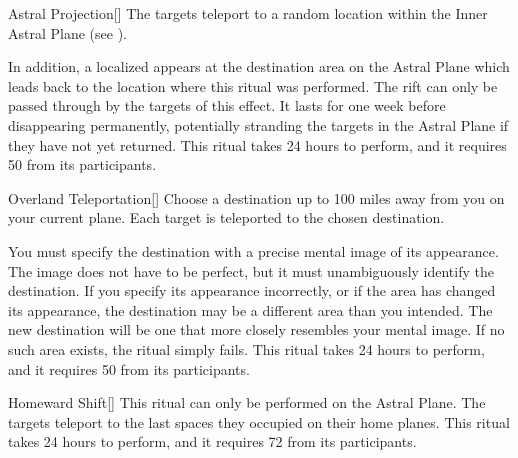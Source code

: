 \lowercase{\hypertarget{spell:Astral Projection}{}}\label{spell:Astral Projection}
\begin{freeability}[Rank 5]{\hypertarget{spell:Astral Projection}{Astral Projection}}[]
The targets teleport to a random location within the Inner Astral Plane (see ).

In addition, a localized  appears at the destination area on the Astral Plane which leads back to the location where this ritual was performed.
The rift can only be passed through by the targets of this effect.
It lasts for one week before disappearing permanently, potentially stranding the targets in the Astral Plane if they have not yet returned.
This ritual takes 24 hours to perform, and it requires 50  from its participants.
\end{freeability}
\vspace{0.25em}



\lowercase{\hypertarget{spell:Overland Teleportation}{}}\label{spell:Overland Teleportation}
\begin{freeability}[Rank 5]{\hypertarget{spell:Overland Teleportation}{Overland Teleportation}}[]
Choose a destination up to 100 miles away from you on your current plane.
Each target is teleported to the chosen destination.

You must specify the destination with a precise mental image of its appearance.
The image does not have to be perfect, but it must unambiguously identify the destination.
If you specify its appearance incorrectly, or if the area has changed its appearance, the destination may be a different area than you intended.
The new destination will be one that more closely resembles your mental image.
If no such area exists, the ritual simply fails.
This ritual takes 24 hours to perform, and it requires 50  from its participants.
\end{freeability}
\vspace{0.25em}



\lowercase{\hypertarget{spell:Homeward Shift}{}}\label{spell:Homeward Shift}
\begin{freeability}[Rank 6]{\hypertarget{spell:Homeward Shift}{Homeward Shift}}[]
This ritual can only be performed on the Astral Plane.
The targets teleport to the last spaces they occupied on their home planes.
This ritual takes 24 hours to perform, and it requires 72  from its participants.
\end{freeability}
\vspace{0.25em}



